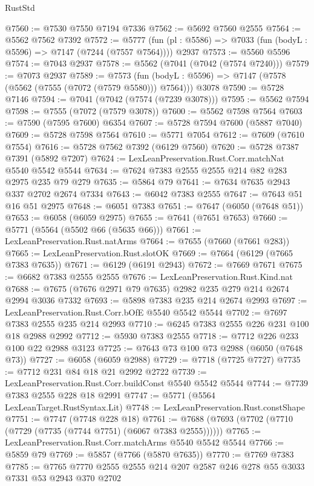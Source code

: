 \begin{lexlean}{RustStd}
\begin{coremodule}
@7560 := @7530 @7550 @7194 @7336
@7562 := @5692 @7560 @2555
@7564 := @5562 @7562 @7392
@7572 := @5777
    (fun (pl : @5586) => @7033 (fun (bodyL : @5596) => @7147 (@7244 (@7557 @7564))))
    @2937
@7573 := @5560 @5596
@7574 := @7043 @2937
@7578 := @5562 (@7041 (@7042 (@7574 @7240)))
@7579 := @7073 @2937
@7589 := @7573
    (fun (bodyL : @5596) => @7147 (@7578 (@5562 (@7555 (@7072 (@7579 @5580))) @7564)))
    @3078
@7590 := @5728 @7146
@7594 := @7041 (@7042 (@7574 (@7239 @3078)))
@7595 := @5562 @7594
@7598 := @7555 (@7072 (@7579 @3078))
@7600 := @5562 @7598 @7564
@7603 := @7590 (@7595 @7600) @6354
@7607 := @5728 @7594 @7600 (@5887 @7040)
@7609 := @5728 @7598 @7564
@7610 := @5771 @7054
@7612 := @7609 (@7610 @7554)
@7616 := @5728 @7562 @7392 (@6129 @7560)
@7620 := @5728 @7387 @7391 (@5892 @7207)
@7624 := LexLeanPreservation.Rust.Corr.matchNat @5540 @5542 @5544
@7634 := @7624 @7383 @2555 @2555 @214 @82 @283 @2975 @235 @79 @279
@7635 := @5864 @79
@7641 := @7634 @7635 @2943 @337 @2702 @2674 @7334
@7643 := @6042 @7383 @2555
@7647 := @7643 @51 @16 @51 @2975
@7648 := @6051 @7383
@7651 := @7647 (@6050 (@7648 @51))
@7653 := @6058 (@6059 @2975)
@7655 := @7641 (@7651 @7653)
@7660 := @5771 (@5564 (@5502 @66 (@5635 @66)))
@7661 := LexLeanPreservation.Rust.natArms
@7664 := @7655 (@7660 (@7661 @283))
@7665 := LexLeanPreservation.Rust.slotOK
@7669 := @7664 (@6129 (@7665 @7383 @7635))
@7671 := @6129 (@6191 @2943)
@7672 := @7669 @7671
@7675 := @6682 @7383 @2555 @2555
@7676 := LexLeanPreservation.Rust.Kind.nat
@7688 := @7675 (@7676 @2971 @79 @7635) @2982 @235 @279 @214 @2674 @2994 @3036 @7332
@7693 := @5898 @7383 @235 @214 @2674 @2993
@7697 := LexLeanPreservation.Rust.Corr.bOfE @5540 @5542 @5544
@7702 := @7697 @7383 @2555 @235 @214 @2993
@7710 := @6245 @7383 @2555 @226 @231 @100 @18 @2988 @2992
@7712 := @5930 @7383 @2555
@7718 := @7712 @226 @233 @100 @22 @2988 @3123
@7725 := @7643 @73 @100 @73 @2988 (@6050 (@7648 @73))
@7727 := @6058 (@6059 @2988)
@7729 := @7718 (@7725 @7727)
@7735 := @7712 @231 @84 @18 @21 @2992 @2722
@7739 := LexLeanPreservation.Rust.Corr.buildConst @5540 @5542 @5544
@7744 := @7739 @7383 @2555 @228 @18 @2991
@7747 := @5771 (@5564 LexLeanTarget.RustSyntax.Lit)
@7748 := LexLeanPreservation.Rust.constShape
@7751 := @7747 (@7748 @228 @18)
@7761 := @7688 (@7693 (@7702 (@7710 (@7729 (@7735 (@7744 @7751) (@6067 @7383 @2555))))))
@7765 := LexLeanPreservation.Rust.Corr.matchArms @5540 @5542 @5544
@7766 := @5859 @79
@7769 := @5857 (@7766 (@5870 @7635))
@7770 := @7769 @7383
@7785 := @7765 @7770 @2555 @2555 @214 @207 @2587 @246 @278 @55 @3033 @7331 @53 @2943 @370 @2702

\end{coremodule}
\end{lexlean}
